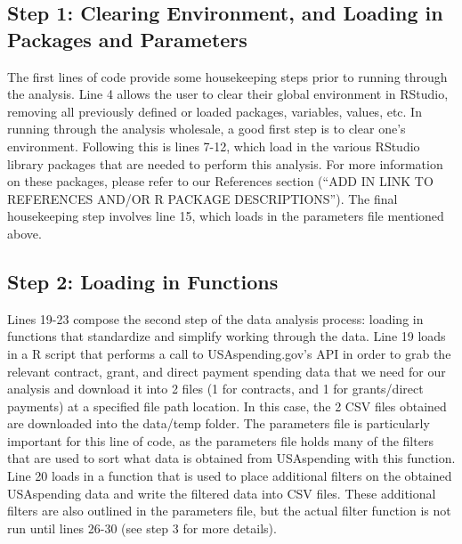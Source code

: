 \documentclass[
]{book}
\begin{document}
\hypertarget{step-1-clearing-environment-and-loading-in-packages-and-parameters}{%
\subsection{Step 1: Clearing Environment, and Loading in Packages and Parameters}\label{step-1-clearing-environment-and-loading-in-packages-and-parameters}}

The first lines of code provide some housekeeping steps prior to running through the analysis. Line 4 allows the user to clear their global environment in RStudio, removing all previously defined or loaded packages, variables, values, etc. In running through the analysis wholesale, a good first step is to clear one's environment. Following this is lines 7-12, which load in the various RStudio library packages that are needed to perform this analysis. For more information on these packages, please refer to our References section (``ADD IN LINK TO REFERENCES AND/OR R PACKAGE DESCRIPTIONS''). The final housekeeping step involves line 15, which loads in the parameters file mentioned above.

\hypertarget{step-2-loading-in-functions}{%
\subsection{Step 2: Loading in Functions}\label{step-2-loading-in-functions}}

Lines 19-23 compose the second step of the data analysis process: loading in functions that standardize and simplify working through the data. Line 19 loads in a R script that performs a call to USAspending.gov's API in order to grab the relevant contract, grant, and direct payment spending data that we need for our analysis and download it into 2 files (1 for contracts, and 1 for grants/direct payments) at a specified file path location. In this case, the 2 CSV files obtained are downloaded into the data/temp folder. The parameters file is particularly important for this line of code, as the parameters file holds many of the filters that are used to sort what data is obtained from USAspending with this function. Line 20 loads in a function that is used to place additional filters on the obtained USAspending data and write the filtered data into CSV files. These additional filters are also outlined in the parameters file, but the actual filter function is not run until lines 26-30 (see step 3 for more details).
\end{document}

